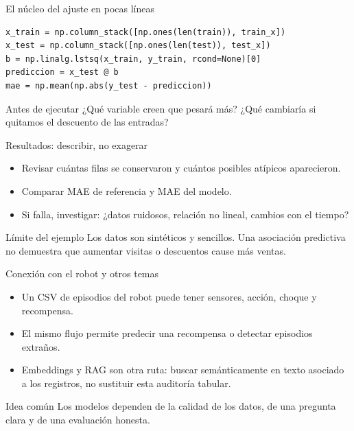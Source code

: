 \documentclass[aspectratio=169,11pt]{beamer}
\begin{document}
\begin{frame}[fragile]{El núcleo del ajuste en pocas líneas}
  \begin{lstlisting}[style=codigo]
x_train = np.column_stack([np.ones(len(train)), train_x])
x_test = np.column_stack([np.ones(len(test)), test_x])
b = np.linalg.lstsq(x_train, y_train, rcond=None)[0]
prediccion = x_test @ b
mae = np.mean(np.abs(y_test - prediccion))
  \end{lstlisting}
  \begin{block}{Antes de ejecutar}
    ¿Qué variable creen que pesará más? ¿Qué cambiaría si quitamos el descuento de las entradas?
  \end{block}
\end{frame}

\begin{frame}{Resultados: describir, no exagerar}
  \begin{itemize}
    \item Revisar cuántas filas se conservaron y cuántos posibles atípicos aparecieron.
    \item Comparar MAE de referencia y MAE del modelo.
    \item Si falla, investigar: ¿datos ruidosos, relación no lineal, cambios con el tiempo?
  \end{itemize}
  \vfill
  \begin{alertblock}{Límite del ejemplo}
    Los datos son sintéticos y sencillos. Una asociación predictiva no demuestra que aumentar visitas o descuentos cause más ventas.
  \end{alertblock}
\end{frame}

\begin{frame}{Conexión con el robot y otros temas}
  \begin{itemize}
    \item Un CSV de episodios del robot puede tener sensores, acción, choque y recompensa.
    \item El mismo flujo permite predecir una recompensa o detectar episodios extraños.
    \item Embeddings y RAG son otra ruta: buscar semánticamente en texto asociado a los registros, no sustituir esta auditoría tabular.
  \end{itemize}
  \vfill
  \begin{block}{Idea común}
    Los modelos dependen de la calidad de los datos, de una pregunta clara y de una evaluación honesta.
  \end{block}
\end{frame}
\end{document}
